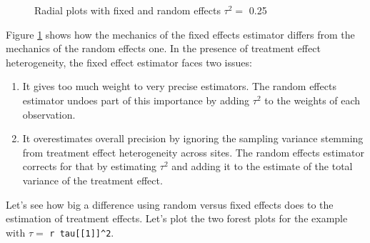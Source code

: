 \documentclass[]{book}
\newenvironment{Shaded}{\begin{snugshade}}{\end{snugshade}}
\newcommand{\KeywordTok}[1]{\textcolor[rgb]{0.13,0.29,0.53}{\textbf{#1}}}
\newcommand{\DataTypeTok}[1]{\textcolor[rgb]{0.13,0.29,0.53}{#1}}
\newcommand{\DecValTok}[1]{\textcolor[rgb]{0.00,0.00,0.81}{#1}}
\newcommand{\StringTok}[1]{\textcolor[rgb]{0.31,0.60,0.02}{#1}}
\newcommand{\OperatorTok}[1]{\textcolor[rgb]{0.81,0.36,0.00}{\textbf{#1}}}
\newcommand{\NormalTok}[1]{#1}
\providecommand{\tightlist}{%
  \setlength{\itemsep}{0pt}\setlength{\parskip}{0pt}}
\theoremstyle{definition}
\theoremstyle{definition}
\theoremstyle{definition}
\theoremstyle{remark}
\let\BeginKnitrBlock\begin \let\EndKnitrBlock\end
\begin{document}
\begin{Shaded}
\end{Shaded}

\begin{figure}[htbp]

{\centering {}

}

\caption{Radial plots with fixed and random effects $\tau^2=$ 0.25}\label{fig:Radial}
\end{figure}

Figure \ref{fig:Radial} shows how the mechanics of the fixed effects
estimator differs from the mechanics of the random effects one. In the
presence of treatment effect heterogeneity, the fixed effect estimator
faces two issues:

\begin{enumerate}
\def\labelenumi{\arabic{enumi}.}
\tightlist
\item
  It gives too much weight to very precise estimators. The random
  effects estimator undoes part of this importance by adding \(\tau^2\)
  to the weights of each observation.
\item
  It overestimates overall precision by ignoring the sampling variance
  stemming from treatment effect heterogeneity across sites. The random
  effects estimator corrects for that by estimating \(\tau^2\) and
  adding it to the estimate of the total variance of the treatment
  effect.
\end{enumerate}

\BeginKnitrBlock{example}
\protect\hypertarget{exm:unnamed-chunk-157}{}{\label{exm:unnamed-chunk-157}
}Let's see how big a difference using random versus fixed effects does
to the estimation of treatment effects. Let's plot the two forest plots
for the example with \(\tau=\) \texttt{r\ tau{[}{[}1{]}{]}\^{}2}.
\EndKnitrBlock{example}
\end{document}
